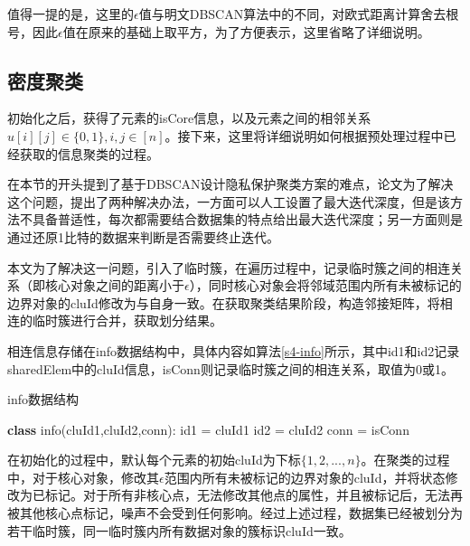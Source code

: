 值得一提的是，这里的$\epsilon$值与明文DBSCAN算法中的不同，对欧式距离计算舍去根号，因此$\epsilon$值在原来的基础上取平方，为了方便表示，这里省略了详细说明。


\subsection{密度聚类}
\label{t1-julei}
初始化之后，获得了元素的isCore信息，以及元素之间的相邻关系$ u[i][j] \in \{0,1\},i,j\in[n]$。接下来，这里将详细说明如何根据预处理过程中已经获取的信息聚类的过程。

在本节的开头提到了基于DBSCAN设计隐私保护聚类方案的难点，论文\cite{bozdemir2021privacy}为了解决这个问题，提出了两种解决办法，一方面可以人工设置了最大迭代深度，但是该方法不具备普适性，每次都需要结合数据集的特点给出最大迭代深度；另一方面则是通过还原1比特的数据来判断是否需要终止迭代。

本文为了解决这一问题，引入了临时簇，在遍历过程中，记录临时簇之间的相连关系（即核心对象之间的距离小于$\epsilon$），同时核心对象会将邻域范围内所有未被标记的边界对象的cluId修改为与自身一致。在获取聚类结果阶段，构造邻接矩阵，将相连的临时簇进行合并，获取划分结果。

相连信息存储在info数据结构中，具体内容如算法\ref{s4-info}所示，其中id1和id2记录sharedElem中的cluId信息，isConn则记录临时簇之间的相连关系，取值为0或1。
\begin{algorithm}
	\caption{info数据结构}
	\label{s4-info}
	\begin{algorithmic}[1]
		\STATE \textbf{class} info(cluId1,cluId2,conn):
		\STATE \hspace{\algorithmicindent} id1 = cluId1
		\STATE \hspace{\algorithmicindent} id2 = cluId2
		\STATE \hspace{\algorithmicindent} conn = isConn
	\end{algorithmic}
\end{algorithm}

在初始化的过程中，默认每个元素的初始cluId为下标$ \{1,2,...,n\} $。在聚类的过程中，对于核心对象，修改其$ \epsilon $范围内所有未被标记的边界对象的cluId，并将状态修改为已标记。对于所有非核心点，无法修改其他点的属性，并且被标记后，无法再被其他核心点标记，噪声不会受到任何影响。经过上述过程，数据集已经被划分为若干临时簇，同一临时簇内所有数据对象的簇标识cluId一致。

